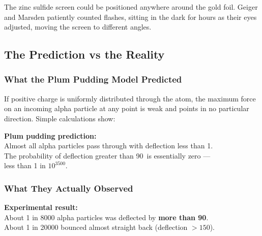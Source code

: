 \documentclass[12pt, a4paper]{book}
\theoremstyle{definition}
\begin{document}
\vspace{0.5em}

The zinc sulfide screen could be positioned anywhere around
the gold foil.
Geiger and Marsden patiently counted flashes,
sitting in the dark for hours as their eyes adjusted,
moving the screen to different angles.

\subsection{The Prediction vs the Reality}

\subsubsection{What the Plum Pudding Model Predicted}

If positive charge is uniformly distributed through the atom,
the maximum force on an incoming alpha particle at any point
is weak and points in no particular direction.
Simple calculations show:

\begin{center}
\begin{tcolorbox}[
  enhanced, colback=PuzzleColor!6, colframe=PuzzleColor!60,
  width=0.85\textwidth, arc=3pt
]
\centering\sffamily\small
\textbf{Plum pudding prediction:}\\[4pt]
Almost all alpha particles pass through with deflection less than 1\textdegree.\\
The probability of deflection greater than 90\textdegree\ is essentially zero ---\\
less than 1 in $10^{3500}$.
\end{tcolorbox}
\end{center}

\subsubsection{What They Actually Observed}

\begin{center}
\begin{tcolorbox}[
  enhanced, colback=WarningColor!8, colframe=WarningColor,
  width=0.85\textwidth, arc=3pt
]
\centering\sffamily\small
\textbf{Experimental result:}\\[4pt]
About 1 in 8000 alpha particles was deflected by \textbf{more than 90\textdegree}.\\
About 1 in 20000 bounced almost straight back (deflection $> 150$\textdegree).
\end{tcolorbox}
\end{center}
\end{document}
